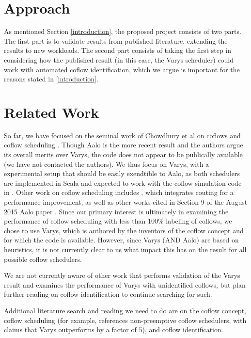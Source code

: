 \documentclass{article}
\begin{document}
\section{Approach}

As mentioned Section \ref{introduction}, the proposed project consists of two parts. The first part is to validate results from published literature, extending the results to new workloads. The second part consists of taking the first step in considering how the published result (in this case, the Varys scheduler) could work with automated coflow identification, which we argue is important for the reasons stated in \ref{introduction}.

\section{Related Work}

So far, we have focused on the seminal work of Chowdhury et al on coflows and coflow scheduling \cite{chowdhury2012coflow, chowdhury2014varys, chowdhury2015aalo}. Though Aalo is the more recent result and the authors argue its overall merits over Varys, the code does not appear to be publically available (we have not contacted the authors). We thus focus on Varys, with a experimental setup that should be easily exendtible to Aalo, as both schedulers are implemented in Scala and expected to work with the coflow simulation code in \cite{website:coflow-repo}. Other work on coflow scheduling includes \cite{zhao2015rapier}, which integrates routing for a performance improvement, as well as other works cited in Section 9 of the August 2015 Aalo paper \cite{chowdhury2015aalo}. Since our primary interest is ultimately in examining the performance of coflow scheduling with less than 100\% labeling of coflows, we chose to use Varys, which is authored by the inventors of the coflow concept and for which the code is available. However, since Varys (AND Aalo) are based on heuristics, it is not currently clear to us what impact this has on the result for all possible coflow schedulers.

We are not currently aware of other work that performs validation of the Varys result and examines the performance of Varys with unidentified coflows, but plan further reading on coflow identification to continue searching for such. 

Additional literature search and reading we need to do are on the coflow concept, coflow scheduling (for example, \cite{chowdhury2014varys} references non-preemptive coflow schedulers, with claims that Varys outperforms by a factor of 5), and coflow identification.
\end{document}
